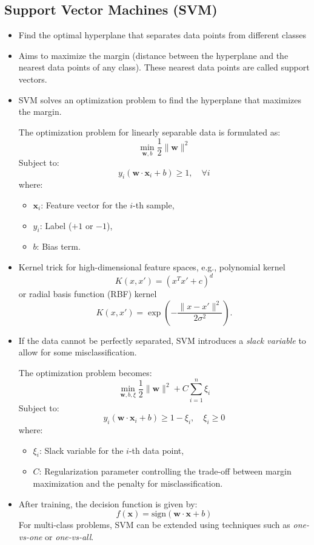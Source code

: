 \documentclass[12pt,a4paper]{article}
\begin{document}
\subsection{Support Vector Machines (SVM)}
\begin{itemize}
    \item Find the optimal hyperplane that separates data points from different classes
    \item Aims to maximize the margin (distance between the hyperplane and the nearest data points of any class). These nearest data points are called support vectors.
    \item SVM solves an optimization problem to find the hyperplane that maximizes the margin.

The optimization problem for linearly separable data is formulated as:
\[
\min_{\mathbf{w}, b} \frac{1}{2} \|\mathbf{w}\|^2
\]
Subject to:
\[
y_i (\mathbf{w} \cdot \mathbf{x}_i + b) \geq 1, \quad \forall i
\]
where:
\begin{itemize}
    \item \( \mathbf{x}_i \): Feature vector for the \(i\)-th sample,
    \item \( y_i \): Label (\(+1\) or \(-1\)),
    \item \( b \): Bias term.
\end{itemize}
\item Kernel trick for high-dimensional feature spaces, e.g., polynomial kernel \[ K(x, x') = (x^T x' + c)^d \] or radial basis function (RBF) kernel \[ K(x, x') = \exp\left(-\frac{\|x - x'\|^2}{2\sigma^2}\right). \]
\item If the data cannot be perfectly separated, SVM introduces a \textit{slack variable} to allow for some misclassification.

The optimization problem becomes:
\[
\min_{\mathbf{w}, b, \xi} \frac{1}{2} \|\mathbf{w}\|^2 + C \sum_{i=1}^n \xi_i
\]
Subject to:
\[
y_i (\mathbf{w} \cdot \mathbf{x}_i + b) \geq 1 - \xi_i, \quad \xi_i \geq 0
\]
where:
\begin{itemize}
    \item \( \xi_i \): Slack variable for the \(i\)-th data point,
    \item \( C \): Regularization parameter controlling the trade-off between margin maximization and the penalty for misclassification.
\end{itemize}

\item After training, the decision function is given by:
\[
f(\mathbf{x}) = \text{sign}(\mathbf{w} \cdot \mathbf{x} + b)
\]
For multi-class problems, SVM can be extended using techniques such as \textit{one-vs-one} or \textit{one-vs-all}.
\end{itemize}
\end{document}
